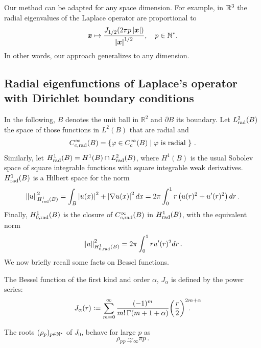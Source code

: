 \documentclass[smallextended]{svjour3}
\begin{document}
Our method can be adapted for any space dimension. For example, in $\mathbb{R}^3$ the radial eigenvalues of the Laplace operator are proportional to
\[  \boldsymbol{x} \mapsto \dfrac{J_{1/2}(2\pi p\left\lvert \boldsymbol{x} \right\rvert)}{\boldsymbol{|x|}^{1/2}}, \quad  p\in\mathbb{N}^*.\] 
In other words, our approach generalizes \cite{Alouges2015} to any dimension.  
\subsection{Radial eigenfunctions of Laplace's operator with Dirichlet boundary conditions}
\label{FunctionalFramework}
In the following, $B$ denotes the unit ball in $\mathbb{R}^2$ and $\partial B$ its boundary. Let $L^2_{\textup{rad}}(B)$ the space of those functions in $L^2(B)$ that are radial and 
$$C^\infty_{c,\textup{rad}}(B) = \left\{\varphi \in C^{\infty}_c(B)\mathrel{}\middle|\mathrel{}\varphi \text{ is radial }\right\}\,.$$
Similarly, let $H^1_{\textup{rad}}(B) = H^1(B) \cap L^2_{\textup{rad}}(B)$, where $H^1(B)$ is the usual Sobolev space of square integrable functions with square integrable weak derivatives. $H^1_{\textup{rad}}(B)$ is a Hilbert space for the norm
\[\left\|u\right\|_{H^1_{\textup{rad}}(B)}^2 = \int_{B}\left\lvert u(x) \right\rvert^2 + \left\lvert \nabla u(x) \right\rvert^2dx = 2\pi\int_{0}^1 r \left(u(r)^2 + u'(r)^2\right) dr \,. \]
Finally, $H^1_{0,\textup{rad}}(B)$ is the closure of $C^\infty_{c,\textup{rad}}(B)$ in $H^1_{\textup{rad}}(B)$, with the equivalent norm
\[\left\|u\right\|_{H^1_{0,\textup{rad}}(B)}^2 = {2\pi \int_{0}^1 r u'(r)^2dr}\,.\] 
\noindent We now briefly recall some facts on Bessel functions. 
\begin{definition}
	\label{defJ0}
	The Bessel function of the first kind and order $\alpha$, $J_\alpha$ is defined by the power series: 
	\begin{equation}
		\label{J0powerSeries}
		J_\alpha(r) \isdef \sum_{m=0}^\infty \frac{(-1)^m}{m! \, \Gamma(m+1+\alpha)} {\bigg(\frac{r}{2}\bigg)}^{2m+\alpha}\!\!\!\!\!\!\!\!\!\!\!\! \,.
	\end{equation}
\end{definition}
The roots $(\rho_p)_{p \in \mathbb{N}^*}$ of $J_0$, behave for large $p$ as 
\[ \rho_p \underset{p \to \infty}{\sim} \pi p\,.\]
\end{document}
